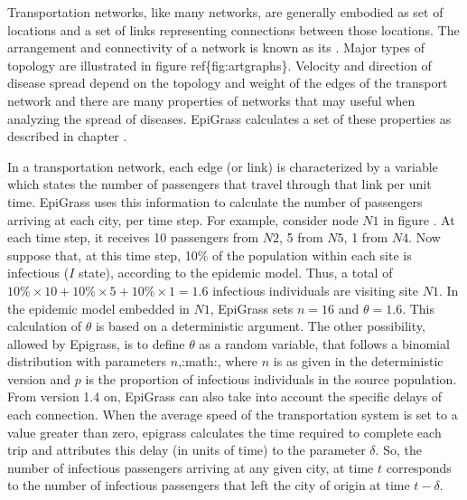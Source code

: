 \documentclass[letterpaper,10pt,english]{sphinxmanual}
\begin{document}
Transportation networks, like many networks, are generally embodied as
set of locations and a set of links representing connections between
those locations. The arrangement and connectivity of a network is
known as its . Major types of topology are
illustrated in figure ref\{fig:artgraphs\}. Velocity and direction of
disease spread depend on the topology and weight of the edges of the
transport network and there are many properties of networks that may
useful when analyzing the spread of diseases. EpiGrass calculates a
set of these properties as described in chapter {\hyperref[\detokenize{analysis:analysis}]{}}.

In a transportation network, each edge (or link) is characterized by a variable  which states the number of passengers that travel through that link per unit time. EpiGrass uses this information to calculate the number of passengers arriving at each city, per time step. For example, consider node \(N1\) in figure {\hyperref[\detokenize{intromodels:simpnet}]{}}. At each time step, it receives 10 passengers from \(N2\), 5 from \(N5\), 1 from \(N4\). Now suppose that, at this time step, 10\% of the population within each site is infectious (\(I\) state), according to the epidemic model. Thus, a total of \(10\% \times 10 + 10\% \times 5 + 10\% \times 1 = 1.6\) infectious individuals are visiting site \(N1\). In the epidemic model embedded in \(N1\), EpiGrass sets \(n = 16\) and \(\theta = 1.6\). This calculation of \(\theta\) is based on a deterministic argument. The other possibility, allowed by Epigrass, is to define \(\theta\) as a random variable, that follows a binomial distribution with parameters \(n\),:math:, where \(n\) is as given in the deterministic version and \(p\) is the proportion of infectious individuals in the source population. From version 1.4 on, EpiGrass can also take into account the specific delays of each connection. When the average speed of the transportation system is set to a value greater than zero, epigrass calculates the time required to complete each trip and attributes this delay (in units of time) to the parameter \(\delta\). So, the number of infectious passengers arriving at any given city, at time \(t\) corresponds to the number of infectious passengers that left the city of origin at time \(t-\delta\).
\end{document}
